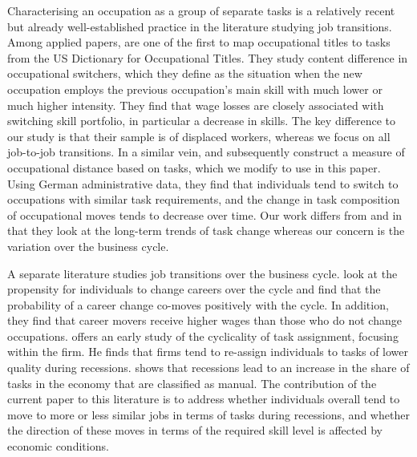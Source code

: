 \documentclass[11pt, oneside]{article}
\begin{document}
	Characterising an occupation as a group of separate tasks is a relatively recent but already well-established practice in the literature studying job transitions. Among applied papers, \cite{Poletaev2008} are one of the first to map occupational titles to tasks from the US Dictionary for Occupational Titles. %
	They study content difference in occupational switchers, which they define as the situation when the new occupation employs the previous occupation's main skill with much lower or much higher intensity. They find that wage losses are closely associated with switching skill portfolio, in particular a decrease in skills. The key difference to our study is that their sample is of displaced workers, whereas we focus on all job-to-job transitions. %
	In a similar vein, \cite{Gathmann2010} and subsequently \cite{robinson2018} construct a measure of occupational distance based on tasks, which we modify to use in this paper. Using German administrative data, they find that individuals tend to switch to occupations with similar task requirements, and the change in task composition of occupational moves tends to decrease over time. Our work differs from \cite{Gathmann2010} and \cite{Poletaev2008} in that they look at the long-term trends of task change whereas our concern is the variation over the business cycle.
	
	\vspace{2mm}
	
	A separate literature studies job transitions over the business cycle. \cite{Carrillo-Tudela2016} look at the propensity for individuals to change careers over the cycle and find that the probability of a career change co-moves positively with the cycle. In addition, they find that career movers receive higher wages than those who do not change occupations. \cite{Devereux2000} offers an early study of the cyclicality of task assignment, focusing within the firm. He finds that firms tend to re-assign individuals to tasks of lower quality during recessions. \cite{Summerfield2016} shows that recessions lead to an increase in the share of tasks in the economy that are classified as manual. The contribution of the current paper to this literature is to address whether individuals overall tend to move to more or less similar jobs in terms of tasks during recessions, and whether the direction of these moves in terms of the required skill level is affected by economic conditions.
\end{document}
